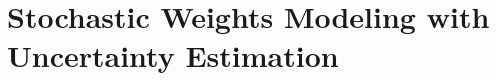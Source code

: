 \documentclass[8pt,xcolor=dvipsnames,compress]{beamer}
\begin{document}








% 
\section{Stochastic Weights Modeling with Uncertainty Estimation}
\end{document}
